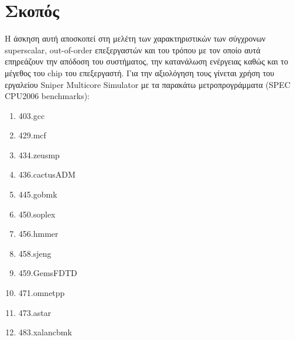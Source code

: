 \documentclass[12pt]{article}
\begin{document}
\large{
\setcounter{tocdepth}{3}
\setcounter{secnumdepth}{3}
\section{Σκοπός}
\vspace{3mm}

Η άσκηση αυτή αποσκοπεί στη μελέτη των χαρακτηριστικών των σύγχρονων
superscalar, out-of-order επεξεργαστών και του τρόπου με τον οποίο αυτά
επηρεάζουν την απόδοση του συστήματος, την κατανάλωση ενέργειας καθώς και το
μέγεθος του chip του επεξεργαστή. Για την αξιολόγηση τους γίνεται χρήση του
εργαλείου Sniper Multicore Simulator με τα παρακάτω μετροπρογράμματα (SPEC CPU2006 benchmarks): 

\begin{enumerate}
  \item 403.gcc 
  \item 429.mcf 
  \item 434.zeusmp
  \item 436.cactusADM 
  \item 445.gobmk
  \item 450.soplex
  \item 456.hmmer
  \item 458.sjeng
  \item 459.GemsFDTD
  \item 471.omnetpp
  \item 473.astar
  \item 483.xalancbmk
\end{enumerate}}

\vspace{3mm}





\end{document}
